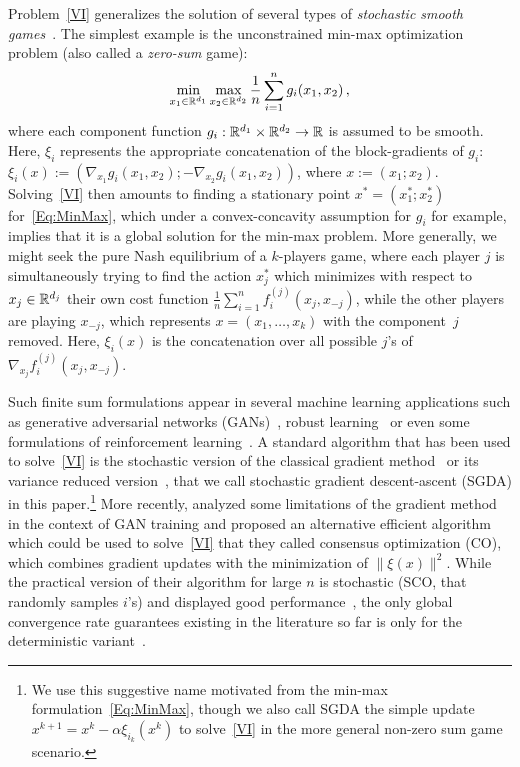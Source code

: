\documentclass{article}
\begin{document}
Problem~\eqref{VI} generalizes the solution of several types of \emph{stochastic smooth games}~\citep{facchinei2007games, scutari2010games, mertikopoulos2019games}. The simplest example is the unconstrained min-max optimization problem (also called a \emph{zero-sum} game):
\vspace{-2mm}
\begin{equation}
\label{Eq:MinMax}
\min_{x_1 \in\R^{d_1}} \max_{x_2 \in\R^{d_2}}\frac{1}{n} \sum_{i=1}^n g_i(x_1,x_2) \, ,
\vspace{-1mm}
\end{equation}
where each component function $g_i:\mathbb{R}^{d_1} \times \mathbb{R}^{d_2}\rightarrow \mathbb{R}$ is assumed to be smooth. Here, $\xi_i$ represents the appropriate concatenation of the block-gradients of $g_i$: $\xi_i(x) := (\nabla_{x_1} g_i(x_1,x_2); -\nabla_{x_2} g_i(x_1,x_2) )$, where $x := (x_1; x_2)$. Solving~\eqref{VI} then amounts to finding a stationary point $x^* = (x_1^*; x_2^*)$ for~\eqref{Eq:MinMax}, which under a convex-concavity assumption for $g_i$ for example, implies that it is a global solution for the min-max problem. More generally, we might seek the pure Nash equilibrium of a $k$-players game, where each player $j$ is simultaneously trying to find the action $x_j^*$ which minimizes with respect to $x_j \in \mathbb{R}^{d_j}$ their own cost function $\frac{1}{n} \sum_{i=1}^n f^{(j)}_i(x_j, x_{-j})$, while the other players are playing $x_{-j}$, which represents $x = (x_1,\ldots,x_k)$ with the component~$j$ removed. Here, $\xi_i(x)$ is the concatenation over all possible $j$'s of $\nabla_{x_j} f_i^{(j)} (x_j, x_{-j})$.

Such finite sum formulations appear in several machine learning applications such as generative adversarial networks (GANs)~\citep{goodfellow2014generative}, robust learning~\citep{wen2014robust} or even some formulations of reinforcement learning~\citep{pfau2016connecting}. A standard algorithm that has been used to solve~\eqref{VI} is the stochastic version of the classical gradient method~\citep{demyanov1972GradientMethodSP, Nemirovski-Juditsky-Lan-Shapiro-2009} or its variance reduced version~\citep{balamurugan2016stochastic}, that we call stochastic gradient descent-ascent (SGDA) in this paper.\footnote{We use this suggestive name motivated from the min-max formulation~\eqref{Eq:MinMax}, though we also call SGDA the simple update $x^{k+1} = x^k - \alpha \xi_{i_k}(x^k)$ to solve~\eqref{VI} in the more general non-zero sum game scenario.} More recently, \citet{mescheder2017numerics} analyzed some limitations of the gradient method in the context of GAN training and proposed an alternative efficient algorithm which could be used to solve~\eqref{VI} that they called consensus optimization (CO), which combines gradient updates with the minimization of $\| \xi(x)\|^2$. While the practical version of their algorithm for large $n$ is stochastic (SCO, that randomly samples $i$'s) and displayed good performance~\citep{mescheder2017numerics}, the only global convergence rate guarantees existing in the literature so far is only for the deterministic variant~\citep{azizian2019tight,abernethy2021last}. 
\end{document}
